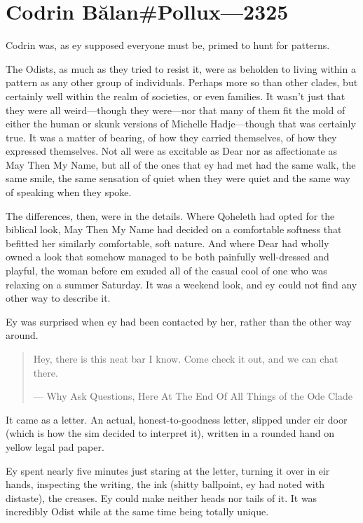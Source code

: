 \hypertarget{codrin-bux103lanpollux-2325}{%
\chapter{Codrin Bălan\#Pollux—2325}\label{codrin-bux103lanpollux-2325}}

Codrin was, as ey supposed everyone must be, primed to hunt for patterns.

The Odists, as much as they tried to resist it, were as beholden to living within a pattern as any other group of individuals. Perhaps more so than other clades, but certainly well within the realm of societies, or even families. It wasn't just that they were all weird---though they were---nor that many of them fit the mold of either the human or skunk versions of Michelle Hadje---though that was certainly true. It was a matter of bearing, of how they carried themselves, of how they expressed themselves. Not all were as excitable as Dear nor as affectionate as May Then My Name, but all of the ones that ey had met had the same walk, the same smile, the same sensation of quiet when they were quiet and the same way of speaking when they spoke.

The differences, then, were in the details. Where Qoheleth had opted for the biblical look, May Then My Name had decided on a comfortable softness that befitted her similarly comfortable, soft nature. And where Dear had wholly owned a look that somehow managed to be both painfully well-dressed and playful, the woman before em exuded all of the casual cool of one who was relaxing on a summer Saturday. It was a weekend look, and ey could not find any other way to describe it.

Ey was surprised when ey had been contacted by her, rather than the other way around.

\begin{quote}
Hey, there is this neat bar I know. Come check it out, and we can chat there.

--- Why Ask Questions, Here At The End Of All Things of the Ode Clade
\end{quote}

\noindent It came as a letter. An actual, honest-to-goodness letter, slipped under eir door (which is how the sim decided to interpret it), written in a rounded hand on yellow legal pad paper.

Ey spent nearly five minutes just staring at the letter, turning it over in eir hands, inspecting the writing, the ink (shitty ballpoint, ey had noted with distaste), the creases. Ey could make neither heads nor tails of it. It was incredibly Odist while at the same time being totally unique.

